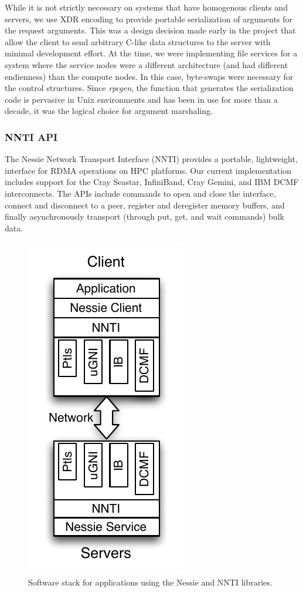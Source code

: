 While it is not strictly necessary on systems that have homogenous clients and servers, we 
use XDR encoding to provide portable serialization of arguments for the request arguments. 
This was a design decision made early in the project that allow the client to
send arbitrary C-like data structures to the server with minimal development effort.  At 
the time, we were implementing file services for a system where the service nodes were
a different architecture (and had different endienness) than the compute nodes.  In this 
case, byte-swaps were necessary for the control structures.  Since
\emph{rpcgen}, the function that generates the serialization code is pervasive in Unix
environments and has been in use for more than a decade, it was the logical choice for 
argument marshaling.  

\subsubsection{NNTI API}

The Nessie Network Transport Interface (NNTI) provides a portable, lightweight,
interface for RDMA operations on HPC platforms.  Our current
implementation includes support for the Cray Seastar, InfiniBand,
Cray Gemini, and IBM DCMF interconnects.  The APIs include commands
to open and close the interface, connect and disconnect to a peer,
register and deregister memory buffers, and finally asynchronously transport
(through put, get, and wait commands) bulk data. 

\begin{figure}
\begin{centering}
\includegraphics{figures/NSSISoftwareStack}
\par\end{centering}
\caption{Software stack for applications using the Nessie and NNTI libraries.}
\label{fig:nssi-software-stack}
\end{figure}



